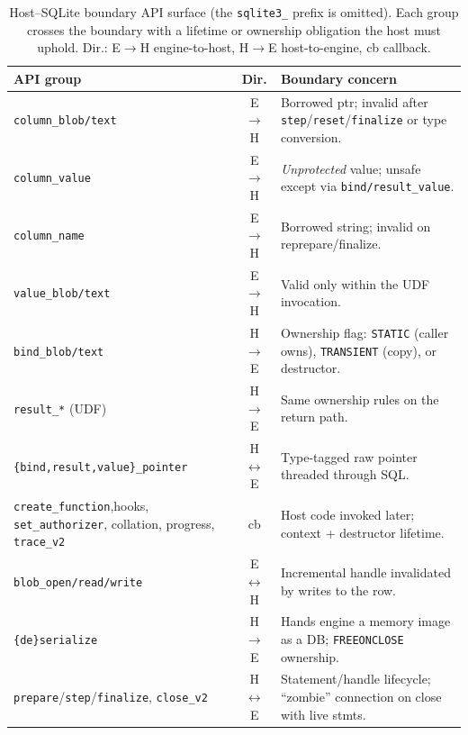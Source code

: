 \documentclass[10pt,twocolumn]{article}
\begin{document}
\begin{table}[t]
\centering
\caption{Host--SQLite boundary API surface (the \texttt{sqlite3\_} prefix is
omitted). Each group crosses the boundary with a lifetime or ownership
obligation the host must uphold. Dir.: E$\rightarrow$H engine-to-host,
H$\rightarrow$E host-to-engine, cb callback.}
\label{tab:apis}
\scriptsize
\renewcommand{\arraystretch}{1.25}
\begin{tabular}{@{}p{2.15cm} c p{3.45cm}@{}}
\toprule
\textbf{API group} & \textbf{Dir.} & \textbf{Boundary concern} \\
\midrule
\texttt{column\_blob/text} & E$\rightarrow$H & Borrowed ptr; invalid after \texttt{step}/\texttt{reset}/\texttt{finalize} or type conversion. \\
\texttt{column\_value} & E$\rightarrow$H & \emph{Unprotected} value; unsafe except via \texttt{bind/result\_value}. \\
\texttt{column\_name} & E$\rightarrow$H & Borrowed string; invalid on reprepare/finalize. \\
\texttt{value\_blob/text} & E$\rightarrow$H & Valid only within the UDF invocation. \\
\texttt{bind\_blob/text} & H$\rightarrow$E & Ownership flag: \texttt{STATIC} (caller owns), \texttt{TRANSIENT} (copy), or destructor. \\
\texttt{result\_*} (UDF) & H$\rightarrow$E & Same ownership rules on the return path. \\
\texttt{\{bind,result,}\newline\texttt{value\}\_pointer} & H$\leftrightarrow$E & Type-tagged raw pointer threaded through SQL. \\
\texttt{create\_function},\newline hooks, \texttt{set\_}\newline\texttt{authorizer}, collation, progress, \texttt{trace\_v2} & cb & Host code invoked later; context + destructor lifetime. \\
\texttt{blob\_open/}\newline\texttt{read/write} & E$\leftrightarrow$H & Incremental handle invalidated by writes to the row. \\
\texttt{\{de\}serialize} & H$\rightarrow$E & Hands engine a memory image as a DB; \texttt{FREEONCLOSE} ownership. \\
\texttt{prepare}/\texttt{step}/\newline\texttt{finalize}, \texttt{close\_v2} & H$\leftrightarrow$E & Statement/handle lifecycle; ``zombie'' connection on close with live stmts. \\
\bottomrule
\end{tabular}
\end{table}
\end{document}
